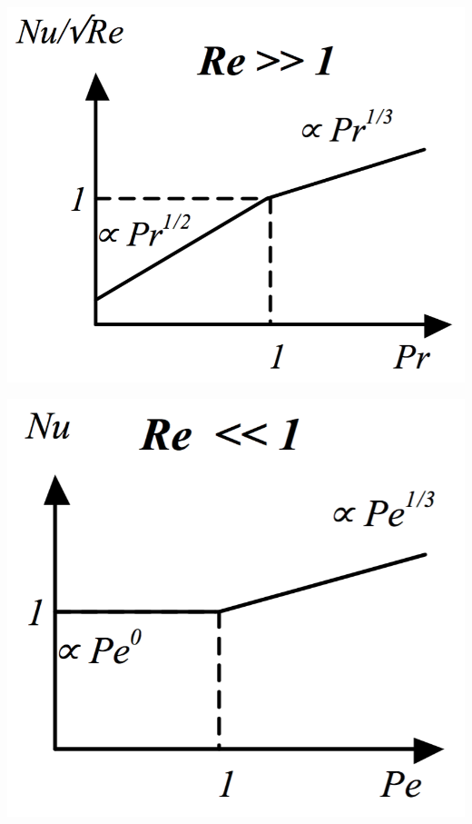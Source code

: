 		\begin{minipage}{0.5\textwidth}
			\begin{flushright}
				\includegraphics[scale=0.3]{ch5/9}
			\end{flushright}
		\end{minipage}
		\begin{minipage}{0.5\textwidth}
				\includegraphics[scale=0.3]{ch5/10}
		\end{minipage}
		

